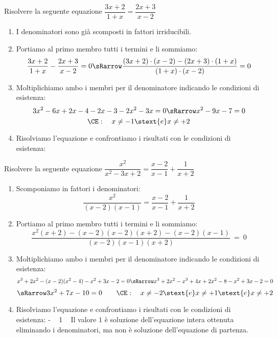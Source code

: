 \begin{esempio}
Risolvere la seguente equazione 
\(\dfrac{3x +2}{1 +x}=\dfrac{2x +3}{x -2}\)
\begin{enumerate} [noitemsep]
\item I denominatori sono già scomposti in fattori irriducibili.
\item Portiamo al primo membro tutti i termini e li sommiamo:
\[\dfrac{3x +2}{1 +x} -\dfrac{2x +3}{x -2} = 0 \sRarrow  
\dfrac{(3x +2) \cdot (x -2) -(2x +3) \cdot (1 +x)}{(1 +x) \cdot (x -2)}=0\]
\item Moltiplichiamo ambo i membri per il denominatore 
indicando le condizioni di esistenza: 
\[3x^2 -6x +2x -4 -2x -3 -2x^2 -3x = 0 \sRarrow x^2 -9x -7 = 0\]
\[\CE: \quad x \neq -1 \stext{e} x \neq +2\]
\item Risolviamo l'equazione e confrontiamo i risultati con 
le condizioni di esistenza:
      { ~ }
      { ~ }
\end{enumerate}
\end{esempio}

\begin{esempio}
Risolvere la seguente equazione 
\(\dfrac{x^2}{x^2 -3 x +2}=\dfrac{x -2}{x -1} +\dfrac{1}{x +2}\)
\begin{enumerate} [noitemsep]
\item Scomponiamo in fattori i denominatori:
\[\dfrac{x^2}{(x -2)(x -1)}=\dfrac{x -2}{x -1} +\dfrac{1}{x +2}\]
\item Portiamo al primo membro tutti i termini e li sommiamo:
\[\dfrac{x^2(x +2) -(x -2)(x -2)(x +2) -(x -2)(x -1)}
       {( x -2 ) ( x -1 ) ( x +2 )}~=~0\]
\item Moltiplichiamo ambo i membri per il denominatore 
indicando le condizioni di esistenza: 
\[x^3 +2x^2 -(x -2)(x^2 -4) -x^2 +3x -2 = 0 \sRarrow
x^3 +2x^2 -x^3 +4x +2x^2 -8 -x^2 +3x -2 = 0
\]
\[\sRarrow 3x^2 +7x -10 = 0 \qquad
\CE: \quad x \neq -2 \stext{e} x \neq +1 \stext{e} x \neq +2\]
\item Risolviamo l'equazione e confrontiamo i risultati con 
le condizioni di esistenza:
      {- ~ }
      {1 ~ }
Il valore \(1\) è soluzione dell'equazione intera ottenuta eliminando i 
denominatori, ma non è soluzione dell'equazione di partenza.
\end{enumerate}
\end{esempio}


